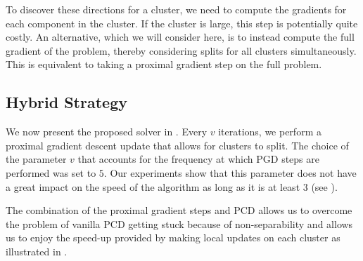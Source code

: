 To discover these directions for a cluster, we need to compute the gradients for each component in the cluster.
If the cluster is large, this step is potentially quite costly.
An alternative, which we will consider here, is to instead compute the full gradient of the problem, thereby considering splits for all clusters simultaneously.
This is equivalent to taking a proximal gradient step on the full problem.

\subsection{Hybrid Strategy}
\label{sec:hybrid-strategy}

We now present the proposed solver in .
Every $v$ iterations, we perform a proximal gradient descent update that allows for clusters to split.
The choice of the parameter $v$ that accounts for the frequency at which PGD steps are performed was set to $5$.
Our experiments show that this parameter does not have a great impact on the speed of the algorithm as long as it is at least $3$ (see ).

The combination of the proximal gradient steps and PCD allows us to overcome the problem of vanilla PCD getting stuck because of non-separability and allows us to enjoy the speed-up provided by making local updates on each cluster as illustrated in .

